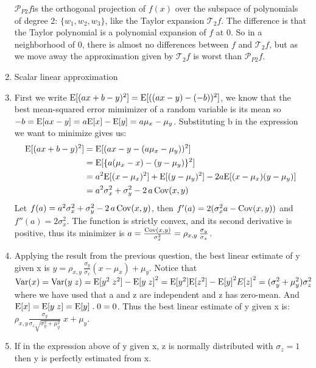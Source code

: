 \documentclass[10pt]{article}
\begin{document}
\begin{enumerate}
    $\mathcal{P}_{P2} f$is the orthogonal projection of $f(x)$ over the subspace of polynomials of degree 2: $\{ w_1, w_2, w_3 \}$, like the Taylor expansion $\mathcal{T}_2 f$. The difference is that the Taylor polynomial is a polynomial expansion of $f$ at 0. So in a neighborhood of $0$, there is almost no differences between $f$ and $\mathcal{T}_2 f$, but as we move away the approximation given by $\mathcal{T}_2 f$ is worst than  $\mathcal{P}_{P2} f$. 
\ee	

\item Scalar linear approximation
\be
	\item First we write $\mathrm{E}[(a x + b - y)^2] = \mathrm{E}[((a x -y) - (-b))^2]$, we know that the best mean-squared error mimimizer of a random variable is its mean so $-b=\mathrm{E}[ax-y] = a \mathrm{E}[x] - \mathrm{E}[y]= a \mu_x - \mu_y$.
	Substituting b in the expression we want to minimize gives us:
	\begin{align*}
		\mathrm{E}[(a x + b - y)^2] 	&= \mathrm{E}[ ( a x - y -  ( a \mu_x - \mu_y) )^2 ] \\
						&= \mathrm{E}[ \{ a (\mu_x - x)  - (y-\mu_y)  \}^2 ] \\
						&= a^2 \mathrm{E}[(x - \mu_x)^2]  + \mathrm{E}[ (y-\mu_y)^2]  -2 a \mathrm{E}[(x - \mu_x) (y-\mu_y)] \\
						&= a^2 \sigma_x^2 + \sigma_y^2 -2\, a\, \mathrm{Cov}(x,y)
	\end{align*}
	Let $f(a) =  a^2 \sigma_x^2 + \sigma_y^2 -2\, a\, \mathrm{Cov}(x,y)$, then $f'(a) = 2 (\sigma_x^2 a - \mathrm{Cov}(x,y))$ and $f''(a) = 2 \sigma_x^2 $.
	The function is strictly convex, and its second derivative is positive, thus its minimizer is $a = \frac{ \mathrm{Cov}(x,y)} {\sigma_x^2} = \rho_{x,y}\, \frac{\sigma_y}{\sigma_x}$.
	
	\item Applying the result from the previous question, the best linear estimate of y given x is $y = \rho_{x,y}\, \frac{\sigma_y}{\sigma_x} (x - \mu_x)  + \mu_y$.
	Notice that $\mathrm{Var}{(x)} = \mathrm{Var}{(y \; z)} = \mathrm{E}{[y^2 \; z^2]} - \mathrm{E}{[y \; z]}^2 = \mathrm{E}{[y^2]}  \mathrm{E}{[z^2]} - \mathrm{E}{[y]}^2  E{[z]}^2 = (\sigma_y^2 + \mu_y^2) \sigma_z^2$ where we have used that a and z are independent and z has zero-mean. And $\mathrm{E}{[x]} = \mathrm{E}[y \; z] = \mathrm{E}[y] \; . \; 0 = 0$. Thus the  best linear estimate of y given x is: $\rho_{x,y} \frac{\sigma_y} {\sigma_z \sqrt{\sigma_y^2 + \mu_y^2}} \; x + \mu_y$.
	 
	 \item If in the expression above of y given x, z is normally distributed with $\sigma_z =1$ then y is perfectly estimated from x.  
 

\end{enumerate}
\end{document}
